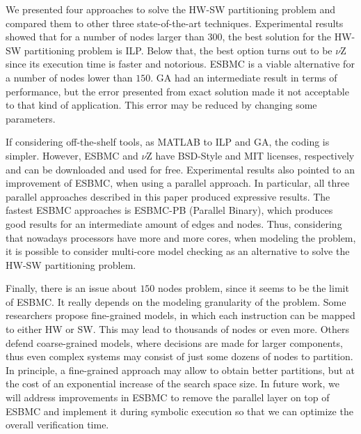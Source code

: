 We presented four approaches to solve the HW-SW partitioning problem and compared them to other three state-of-the-art techniques. Experimental results showed that for a number of nodes larger than $300$, the best solution for the HW-SW partitioning problem is ILP. Below that, the best option turns out to be $\nu$Z since its execution time is faster and notorious. ESBMC is a viable alternative for a number of nodes lower than $150$.  GA had an intermediate result in terms of performance, but the error presented from exact solution made it not acceptable to that kind of application. This error may be reduced by changing some parameters. 


If considering off-the-shelf tools, as MATLAB to ILP and GA, the coding is simpler. However, ESBMC and $\nu$Z have BSD-Style and MIT licenses, respectively and can be downloaded and used for free. Experimental results also pointed to an improvement of ESBMC, when using a parallel approach. In particular, all three parallel approaches described in this paper produced expressive results. The fastest ESBMC approaches is ESBMC-PB (Parallel Binary), which produces good results for an intermediate amount of edges and nodes. Thus, considering that nowadays processors have more and more cores, when modeling the problem, it is possible to consider multi-core model checking as an alternative to solve the HW-SW partitioning problem. 

Finally, there is an issue about $150$ nodes problem, since it seems to be the limit of ESBMC. It really depends on the modeling granularity of the problem. Some researchers propose fine-grained models, in which each instruction can be mapped to either HW or SW. This may lead to thousands of nodes or even more. Others defend coarse-grained models, where decisions are made for larger components, thus even complex systems may consist of just some dozens of nodes to partition. In principle, a fine-grained approach may allow to obtain better partitions, but at the cost of an exponential increase of the search space size. In future work, we will address improvements in ESBMC to remove the parallel layer on top of ESBMC and implement it during symbolic execution so that we can optimize the overall verification time.


